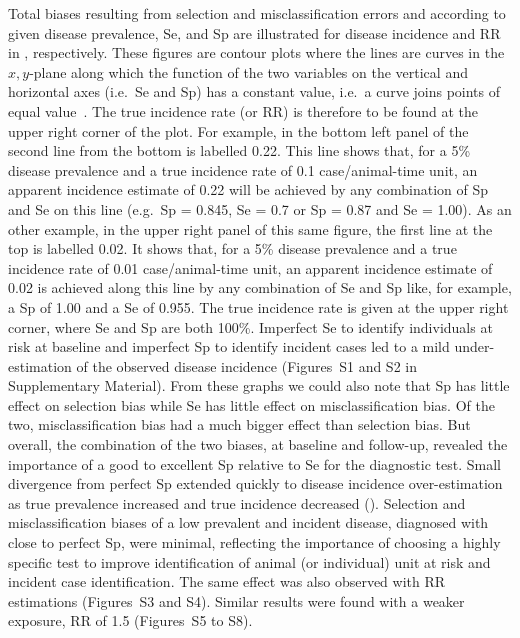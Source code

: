 Total biases resulting from selection and misclassification errors and according
to given disease prevalence, Se, and Sp are illustrated for disease incidence
and RR in , respectively.
These figures are contour plots where the lines are curves in the \(x, y\)-plane
along which the function of the two variables on the vertical and horizontal
axes (i.e.\ Se and Sp) has a constant value, i.e.\ a curve joins points of equal
value~\citep{courant_1996}.
The true incidence rate (or RR) is therefore to be found at the upper right
corner of the plot.
For example, in the bottom left panel of  the second
line from the bottom is labelled 0.22.
This line shows that, for a 5\% disease prevalence and a true incidence rate of
0.1 case/animal-time unit, an apparent incidence estimate of 0.22 will be
achieved by any combination of Sp and Se on this line (e.g.\ Sp = 0.845, Se =
0.7 or Sp = 0.87 and Se = 1.00).
As an other example, in the upper right panel of this same figure, the first
line at the top is labelled 0.02.
It shows that, for a 5\% disease prevalence and a true incidence rate of 0.01
case/animal-time unit, an apparent incidence estimate of 0.02 is achieved along
this line by any combination of Se and Sp like, for example, a Sp of 1.00 and a
Se of 0.955. The true incidence rate is given at the upper right corner, where
Se and Sp are both 100\%.
Imperfect Se to identify individuals at risk at baseline and imperfect Sp to
identify incident cases led to a mild under-estimation of the observed disease
incidence (Figures~S1 and S2 in Supplementary Material).
From these graphs we could also note that Sp has little effect on selection bias
while Se has little effect on misclassification bias.
Of the two, misclassification bias had a much bigger effect than selection bias.
But overall, the combination of the two biases, at baseline and follow-up,
revealed the importance of a good to excellent Sp relative to Se for the
diagnostic test.
Small divergence from perfect Sp extended quickly to disease incidence
over-estimation as true prevalence increased and true incidence decreased
().
Selection and misclassification biases of a low prevalent and incident disease,
diagnosed with close to perfect Sp, were minimal, reflecting the importance of
choosing a highly specific test to improve identification of animal (or
individual) unit at risk and incident case identification.
The same effect was also observed with RR estimations (Figures~S3 and S4).
Similar results were found with a weaker exposure, RR of 1.5 (Figures~S5 to S8).

